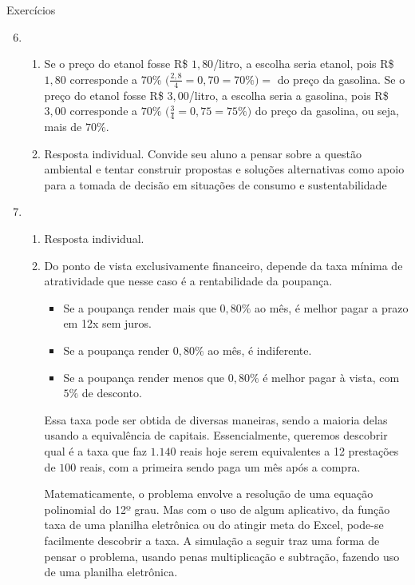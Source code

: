  \begin{answer}{Exercícios}
  { 
  \exerciselist
  \begin{enumerate}
    \setcounter{enumi}{5}
      \item
  \begin{enumerate}
    \item Se o preço do etanol fosse R\$ $1{,}80$/litro, a escolha seria etanol, pois R\$ $1{,}80$ corresponde a $70$\% $\big(\frac{2{,}8}{4}=0{,}70=70\%\big)=$ do preço da gasolina. Se o preço do etanol fosse R\$ $3{,}00$/litro, a escolha seria a gasolina, pois R\$ $3{,}00$ corresponde a $70\%$ $\big(\frac{3}{4}=0{,}75=75\%\big)$ do preço da gasolina, ou seja, mais de $70\%$.
    \item Resposta individual. Convide seu aluno a pensar sobre a questão ambiental e tentar construir propostas e soluções alternativas como apoio para a tomada de decisão em situações de consumo e sustentabilidade
  \end{enumerate}

      \item 
  \begin{enumerate}
    \item Resposta individual.
    \item Do ponto de vista exclusivamente financeiro, depende da taxa mínima de atratividade que nesse caso é a rentabilidade da poupança.
    \begin{itemize}
    \item Se a poupança render mais que $0,80\%$ ao mês, é melhor pagar a prazo em 12x sem juros.
    \item Se a poupança render $0,80\%$ ao mês, é indiferente.
    \item Se a poupança render menos que $0,80\%$ é melhor pagar à vista, com $5\%$ de desconto.
    \end{itemize}

    Essa taxa pode ser obtida de diversas maneiras, sendo a maioria delas usando a equivalência de capitais. Essencialmente, queremos descobrir qual é a taxa que faz $1.140$ reais hoje serem equivalentes a 12 prestações de $100$ reais, com a primeira sendo paga um mês após a compra. 

    Matematicamente, o problema envolve a resolução de uma equação polinomial do 12º grau. Mas com o uso de algum aplicativo, da função taxa de uma planilha eletrônica ou do atingir meta do Excel, pode-se facilmente descobrir a taxa. A simulação a seguir traz uma forma de pensar o problema, usando penas multiplicação e subtração, fazendo uso de uma planilha eletrônica.


\end{enumerate}
\end{enumerate}}
\end{answer}
